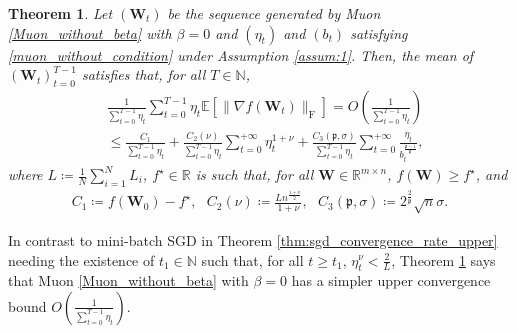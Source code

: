 \documentclass[twoside,11pt]{article}
\newtheorem{thm}{Theorem}[section]
\begin{document}
\begin{thm}\label{thm:muon_without_convergence_rate_upper}
Let $(\bm{W}_t)$ be the sequence generated by Muon \eqref{Muon_without_beta} with $\beta = 0$ and $(\eta_t)$ and $(b_t)$ satisfying \eqref{muon_without_condition} under Assumption \ref{assum:1}. Then, the mean of $(\bm{W}_t)_{t = 0}^{T -1}$ satisfies that, for all $T \in \mathbb{N}$,
\begin{align*}
&\frac{1}{\sum_{t= 0}^{T-1} \eta_t}
\sum_{t= 0}^{T -1} \eta_t 
\mathbb{E} [\| \nabla f (\bm{W}_t)\|_{\mathrm{F}}]
= O \left( \frac{1}{\sum_{t= 0}^{T -1} \eta_t} \right) \\
&\leq
\frac{C_1}{\sum_{t= 0}^{T-1} \eta_t}
+ \frac{C_2 (\nu)}{\sum_{t=0}^{T-1} \eta_t} \sum_{t=0}^{+ \infty} \eta_t^{1 + \nu}
+ \frac{C_3 (\mathfrak{p}, \sigma)}{\sum_{t=0}^{T-1} \eta_t} \sum_{t=0}^{+ \infty} \frac{\eta_t}{b_t^{\frac{\mathfrak{p}-1}{\mathfrak{p}}}},
\end{align*}
where $L \coloneqq \frac{1}{N} \sum_{i=1}^N L_i$, $f^\star \in \mathbb{R}$ is such that, for all $\bm{W} \in \mathbb{R}^{m \times n}$, $f(\bm{W}) \geq f^\star$, and 
\begin{align*}
C_1 \coloneqq f(\bm{W}_{0}) - f^{\star}, \text{ }
C_2 (\nu) \coloneqq \frac{L n^{\frac{1 + \nu}{2}} }{1 + \nu}, \text{ } 
C_3 (\mathfrak{p}, \sigma) \coloneqq 2^{\frac{2}{\mathfrak{p}}} \sqrt{n} \sigma.
\end{align*}
\end{thm}

In contrast to mini-batch SGD in Theorem \ref{thm:sgd_convergence_rate_upper} needing the existence of $t_1 \in \mathbb{N}$ such that, for all $t \geq t_1$, $\eta_t^\nu < \frac{2}{L}$, Theorem \ref{thm:muon_without_convergence_rate_upper} says that Muon \eqref{Muon_without_beta} with $\beta = 0$ has a simpler upper convergence bound $O(\frac{1}{\sum_{t=0}^{T-1} \eta_t})$. 
\end{document}
